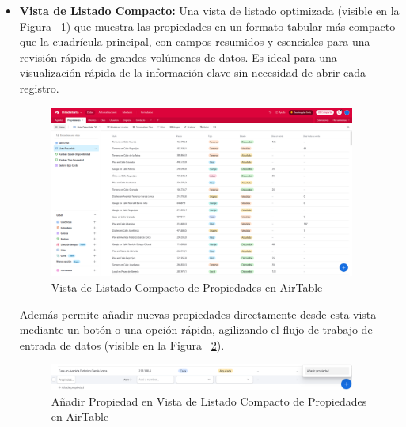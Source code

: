 \begin{enumerate}
\begin{itemize}
        \item \textbf{Vista de Listado Compacto:} Una vista de listado optimizada (visible en la Figura ~\ref{fig:listaresumidapropiedadairtable}) que muestra las propiedades en un formato tabular más compacto que la cuadrícula principal, con campos resumidos y esenciales para una revisión rápida de grandes volúmenes de datos. Es ideal para una visualización rápida de la información clave sin necesidad de abrir cada registro.
    
        \begin{figure}[H]
            \begin{center}
                \includegraphics[width = 0.95\textwidth]{Figuras/listaresumidapropiedadairtable.png}
            \end{center}
            \caption{\label{fig:listaresumidapropiedadairtable} Vista de Listado Compacto de Propiedades en AirTable}
        \end{figure}

        Además permite añadir nuevas propiedades directamente desde esta vista mediante un botón o una opción rápida, agilizando el flujo de trabajo de entrada de datos (visible en la Figura ~\ref{fig:listaresumidaaddpropiedadairtable}).

        \begin{figure}[H]
            \begin{center}
                \includegraphics[width = 0.95\textwidth]{Figuras/listaresumidaaddpropiedadairtable.png}
            \end{center}
            \caption{\label{fig:listaresumidaaddpropiedadairtable} Añadir Propiedad en Vista de Listado Compacto de Propiedades en AirTable}
        \end{figure}
    

\end{itemize}
\end{enumerate}
